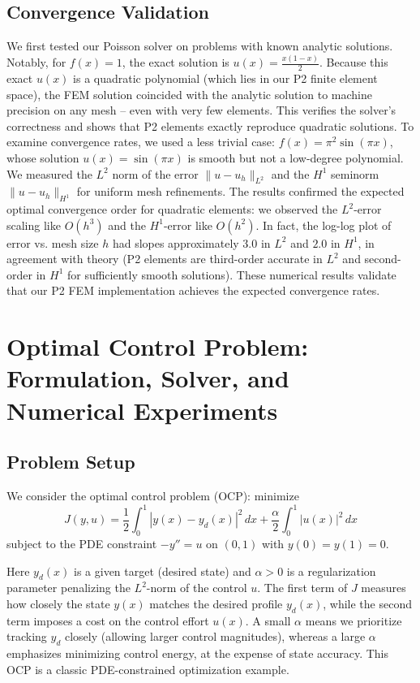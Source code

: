 \documentclass{article}
\begin{document}
\subsection{Convergence Validation}
We first tested our Poisson solver on problems with known analytic solutions. Notably, for $f(x)=1$, the exact solution is $u(x)=\frac{x(1-x)}{2}$. Because this exact $u(x)$ is a quadratic polynomial (which lies in our P2 finite element space), the FEM solution coincided with the analytic solution to machine precision on any mesh – even with very few elements. This verifies the solver’s correctness and shows that P2 elements exactly reproduce quadratic solutions. To examine convergence rates, we used a less trivial case: $f(x)=\pi^2\sin(\pi x)$, whose solution $u(x)=\sin(\pi x)$ is smooth but not a low-degree polynomial. We measured the $L^2$ norm of the error $\|u - u_h\|_{L^2}$ and the $H^1$ seminorm $\|u - u_h\|_{H^1}$ for uniform mesh refinements. The results confirmed the expected optimal convergence order for quadratic elements: we observed the $L^2$-error scaling like $O(h^3)$ and the $H^1$-error like $O(h^2)$. In fact, the log-log plot of error vs. mesh size $h$ had slopes approximately $3.0$ in $L^2$ and $2.0$ in $H^1$, in agreement with theory (P2 elements are third-order accurate in $L^2$ and second-order in $H^1$ for sufficiently smooth solutions). These numerical results validate that our P2 FEM implementation achieves the expected convergence rates.

\section{Optimal Control Problem: Formulation, Solver, and Numerical Experiments}

\subsection{Problem Setup}
We consider the optimal control problem (OCP): minimize
\begin{equation}
J(y,u) = \frac{1}{2}\int_0^1 |y(x)-y_d(x)|^2\,dx + \frac{\alpha}{2}\int_0^1 |u(x)|^2\,dx
\end{equation}
subject to the PDE constraint $-y'' = u$ on $(0,1)$ with $y(0)=y(1)=0$.

Here $y_d(x)$ is a given target (desired state) and $\alpha>0$ is a regularization parameter penalizing the $L^2$-norm of the control $u$. The first term of $J$ measures how closely the state $y(x)$ matches the desired profile $y_d(x)$, while the second term imposes a cost on the control effort $u(x)$. A small $\alpha$ means we prioritize tracking $y_d$ closely (allowing larger control magnitudes), whereas a large $\alpha$ emphasizes minimizing control energy, at the expense of state accuracy. This OCP is a classic PDE-constrained optimization example.
\end{document}
